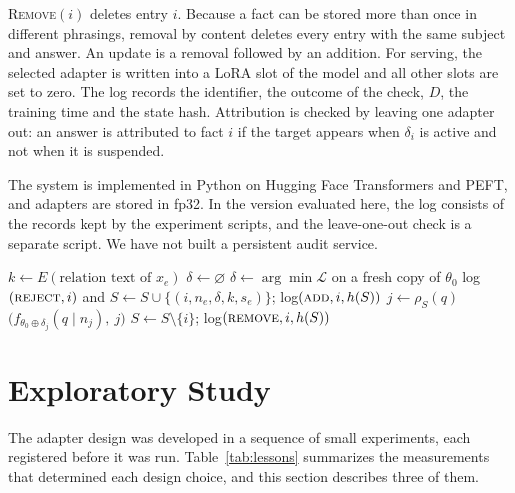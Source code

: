 \documentclass[journal,10pt]{IEEEtran}
\newcommand{\revoke}{\textsc{Remove}}
\begin{document}
\revoke$(i)$ deletes entry $i$. Because a fact can be stored more than once in different
phrasings, removal by content deletes every entry with the same subject and answer. An
update is a removal followed by an addition. For serving, the selected adapter is written
into a LoRA slot of the model and all other slots are set to zero. The log records the
identifier, the outcome of the check, $D$, the training time and the state hash.
Attribution is checked by leaving one adapter out: an answer is attributed to fact $i$ if
the target appears when $\delta_i$ is active and not when it is suspended.

The system is implemented in Python on Hugging Face Transformers and PEFT, and adapters
are stored in fp32. In the version evaluated here, the log consists of the records kept
by the experiment scripts, and the leave-one-out check is a separate script. We have not
built a persistent audit service.

\begin{algorithm}[t]
\caption{Operations on the store}
\label{alg:txn}
\begin{algorithmic}[1]
  \State $k\gets E(\text{relation text of } x_e)$
   \State $\delta\gets\varnothing$
  \Else
    \State $\delta\gets\arg\min\mathcal{L}$ on a fresh copy of $\theta_0$ 
     \State log$(\textsc{reject},i)$ and \Return \EndIf
  \EndIf
  \State $S\gets S\cup\{(i,n_e,\delta,k,s_e)\}$; log$(\textsc{add},i,h(S))$
\EndFunction
{}
  \State $j\gets\rho_S(q)$
  \State \Return $\big(f_{\theta_0\oplus\delta_j}(q\mid n_j),\ j\big)$ 
\EndFunction
{}
  \State $S\gets S\setminus\{i\}$; log$(\textsc{remove},i,h(S))$
\EndFunction
\end{algorithmic}
\end{algorithm}

\section{Exploratory Study}
\label{sec:lessons}

The adapter design was developed in a sequence of small experiments, each registered
before it was run. Table~\ref{tab:lessons} summarizes the measurements that determined
each design choice, and this section describes three of them.
\end{document}
